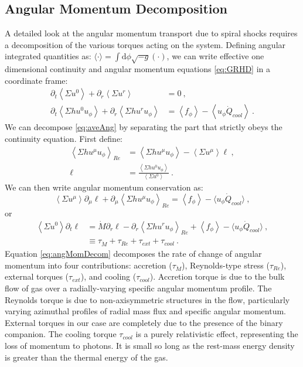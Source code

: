 \documentclass{emulateapj}
\newcommand{\Sig}{\Sigma}
\newcommand{\dd}{\mbox{d}}
\newcommand{\ave}[1]{\left \langle #1 \right \rangle}
\newcommand{\avet}[1]{ \langle #1 \rangle}
\newcommand{\aveRe}[1]{\left \langle #1 \right \rangle_{Re}}
\begin{document}
\subsection{Angular Momentum Decomposition}
\label{subsec:angMomDecom}

A detailed look at the angular momentum transport due to spiral shocks requires a decomposition of the various torques acting on the system. Defining angular integrated quantities as: $\avet{\cdot} = \int \dd \phi \sqrt{-g} (\cdot)$, we can write effective one dimensional continuity and angular momentum equations \eqref{eq:GRHD} in a coordinate frame:
\begin{align}
	\partial_t \ave{\Sig u^0} + \partial_r \ave{\Sig u^r} &= 0 \ ,\label{eq:aveAng}\\
	\partial_t \ave{\Sig h u^0 u_\phi} + \partial_r \ave{\Sig h u^r u_\phi} &= \ave{f_\phi}- \ave{u_\phi \dot{Q}_{cool}} \ .\nonumber
\end{align} 
We can decompose \eqref{eq:aveAng} by separating the part that strictly obeys the continuity equation.  First define:
\begin{align*}
	\aveRe{\Sig h u^\mu u_\phi} &= \ave{\Sig h u^\mu u_\phi} - \ave{\Sig u^\mu} \ell \ , \\
	\ell &= \frac{\ave{\Sig h u^0 u_\phi}}{\ave{\Sig u^0} } \ .
\end{align*}
We can then write angular momentum conservation as:
\begin{equation}
	\ave{\Sig u^\mu} \partial_\mu \ell + \partial_\mu \aveRe{\Sig h u^\mu u_\phi} =  \ave{f_\phi}- \langle u_\phi \dot{Q}_{cool} \rangle \ , 
\end{equation}
or
\begin{align}
	\ave{\Sig u^0} \partial_t \ell &= \dot{M} \partial_r \ell -  \partial_r \aveRe{\Sig h u^r u_\phi} +  \ave{f_\phi}- \langle u_\phi \dot{Q}_{cool} \rangle \ , \nonumber \\
	&\equiv \tau_{\dot{M}} + \tau_{Re} + \tau_{ext} + \tau_{cool} \ . \label{eq:angMomDecom}
\end{align} 
Equation \eqref{eq:angMomDecom} decomposes the rate of change of angular momentum into four contributions: accretion ($\tau_{\dot{M}}$), Reynolds-type stress ($\tau_{Re}$), external torques ($\tau_{ext}$), and cooling ($\tau_{cool}$).  Accretion torque is due to the bulk flow of gas over a radially-varying specific angular momentum profile. The Reynolds torque is due to non-axisymmetric structures in the flow, particularly varying azimuthal profiles of radial mass flux and specific angular momentum. External torques in our case are completely due to the presence of the binary companion. The cooling torque $\tau_{cool}$ is a purely relativistic effect, representing the loss of momentum to photons. It is small so long as the rest-mass energy density is greater than the thermal energy of the gas.
\end{document}
